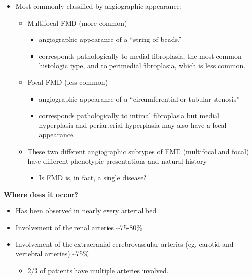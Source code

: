 \documentclass[
]{book}
\providecommand{\tightlist}{%
  \setlength{\itemsep}{0pt}\setlength{\parskip}{0pt}}
\begin{document}
\begin{itemize}
\item
  Most commonly classified by angiographic appearance:

  \begin{itemize}
  \item
    Multifocal FMD (more common)

    \begin{itemize}
    \item
      angiographic appearance of a ``string of beads.''
    \item
      corresponds pathologically to medial fibroplasia, the most
      common histologic type, and to perimedial fibroplasia, which
      is less common.
    \end{itemize}
  \item
    Focal FMD (less common)

    \begin{itemize}
    \item
      angiographic appearance of a ``circumferential or tubular
      stenosis''
    \item
      corresponds pathologically to intimal fibroplasia but medial
      hyperplasia and periarterial hyperplasia may also have a
      focal appearance.
    \end{itemize}
  \item
    These two different angiographic subtypes of FMD (multifocal and
    focal) have different phenotypic presentations and natural
    history

    \begin{itemize}
    \tightlist
    \item
      Is FMD is, in fact, a single disease?
    \end{itemize}
  \end{itemize}
\end{itemize}

\textbf{Where does it occur?}

\begin{itemize}
\item
  Has been observed in nearly every arterial bed
\item
  Involvement of the renal arteries \textasciitilde75-80\%
\item
  Involvement of the extracranial cerebrovascular arteries (eg,
  carotid and vertebral arteries) \textasciitilde75\%

  \begin{itemize}
  \tightlist
  \item
    2/3 of patients have multiple arteries involved.
  \end{itemize}
\end{itemize}
\end{document}
